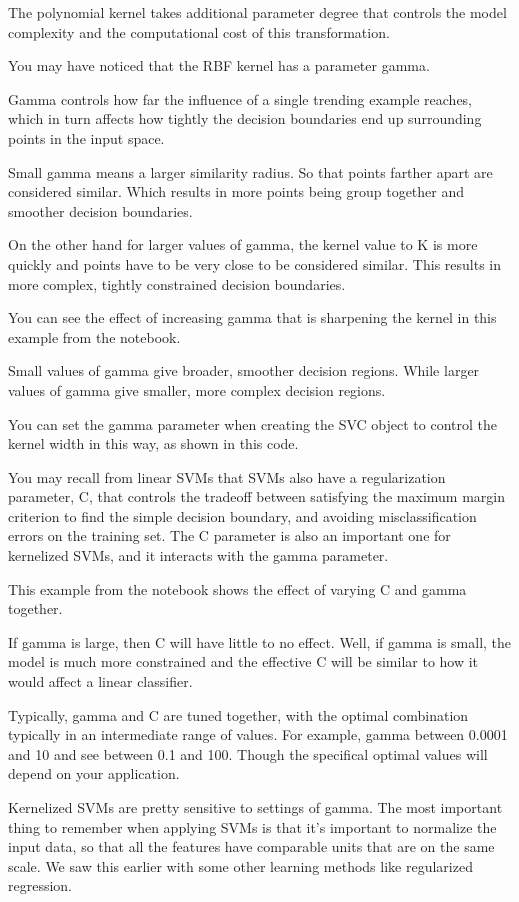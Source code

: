 \begin{multicols}{2}
The polynomial kernel takes additional parameter degree that controls the model complexity and the computational cost of this transformation. 

You may have noticed that the RBF kernel has a parameter gamma. 

Gamma controls how far the influence of a single trending example reaches, which in turn affects how tightly the decision boundaries end up surrounding points in the input space. 

Small gamma means a larger similarity radius. So that points farther apart are considered similar. Which results in more points being group together and smoother decision boundaries. 

On the other hand for larger values of gamma, the kernel value to K is more quickly and points have to be very close to be considered similar. This results in more complex, tightly constrained decision boundaries. 

You can see the effect of increasing gamma that is sharpening the kernel in this example from the notebook. 

Small values of gamma give broader, smoother decision regions. While larger values of gamma give smaller, more complex decision regions. 

You can set the gamma parameter when creating the SVC object to control the kernel width in this way, as shown in this code. 

You may recall from linear SVMs that SVMs also have a regularization parameter, C, that controls the tradeoff between satisfying the maximum margin criterion to find the simple decision boundary, and avoiding misclassification errors on the training set. The C parameter is also an important one for kernelized SVMs, and it interacts with the gamma parameter. 

This example from the notebook shows the effect of varying C and gamma together. 

If gamma is large, then C will have little to no effect. Well, if gamma is small, the model is much more constrained and the effective C will be similar to how it would affect a linear classifier. 

Typically, gamma and C are tuned together, with the optimal combination typically in an intermediate range of values. For example, gamma between 0.0001 and 10 and see between 0.1 and 100. Though the specifical optimal values will depend on your application. 

Kernelized SVMs are pretty sensitive to settings of gamma. The most important thing to remember when applying SVMs is that it's important to normalize the input data, so that all the features have comparable units that are on the same scale. We saw this earlier with some other learning methods like regularized regression. 


\end{multicols}
